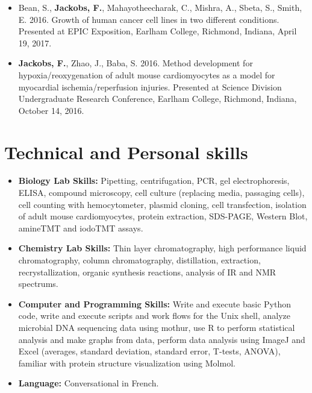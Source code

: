 \documentclass[10pt,letterpaper,sans]{moderncv}        %
\begin{document}
\begin{itemize}

\item{\small Bean, S., {\textbf{Jackobs, F.}, Mahayotheecharak, C., Mishra, A., Sbeta, S., Smith, E. 2016. Growth of human cancer cell lines in two different conditions. Presented at EPIC Exposition, Earlham College, Richmond, Indiana, April 19, 2017.}}

\vspace{6pt}

\item{\small{\textbf{Jackobs, F.}, Zhao, J., Baba, S. 2016. Method development for hypoxia/reoxygenation of adult mouse cardiomyocytes as a model for myocardial ischemia/reperfusion injuries. Presented at Science Division Undergraduate Research Conference, Earlham College, Richmond, Indiana, October 14, 2016.}}

\end{itemize}

\section{Technical and Personal skills}

\vspace{6pt}

\begin{itemize}

\item \textbf{Biology Lab Skills:} Pipetting, centrifugation, PCR, gel electrophoresis, ELISA, compound microscopy, cell culture (replacing media, passaging cells), cell counting with hemocytometer, plasmid cloning, cell transfection, isolation of adult mouse cardiomyocytes, protein extraction, SDS-PAGE, Western Blot, amineTMT and iodoTMT assays.

\vspace{6pt}

\item \textbf{Chemistry Lab Skills:} Thin layer chromatography, high performance liquid chromatography, column chromatography, distillation, extraction, recrystallization, organic synthesis reactions, analysis of IR and NMR spectrums.

\vspace{6pt}

\item \textbf{Computer and Programming Skills:} Write and execute basic Python code, write and execute scripts and work flows for the Unix shell, analyze microbial DNA sequencing data using mothur, use R  to perform statistical analysis and make graphs from data, perform data analysis using ImageJ and Excel (averages, standard deviation, standard error, T-tests, ANOVA), familiar with protein structure visualization using Molmol.

\vspace{6pt}

\item \textbf{Language:} Conversational in French.

\end{itemize}
\end{document}
